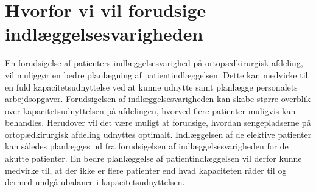 \section{Hvorfor vi vil forudsige indlæggelsesvarigheden}

En forudsigelse af patienters indlæggelsesvarighed på ortopædkirurgisk afdeling, vil muliggør en bedre planlægning af patientindlæggelsen. Dette kan medvirke til en fuld kapacitetsudnyttelse ved at kunne udnytte samt planlægge personalets arbejdsopgaver. Forudsigelsen af indlæggelsesvarigheden kan skabe større overblik over kapacitetsudnyttelsen på afdelingen, hvorved flere patienter muligvis kan behandles. Herudover vil det være muligt at forudsige, hvordan sengepladserne på ortopædkirurgisk afdeling udnyttes optimalt. Indlæggelsen af de elektive patienter kan således planlægges ud fra forudsigelsen af indlæggelsesvarigheden for de akutte patienter. En bedre planlæggelse af patientindlæggelsen vil derfor kunne medvirke til, at der ikke er flere patienter end hvad kapaciteten råder til og dermed undgå ubalance i kapacitetsudnyttelsen.